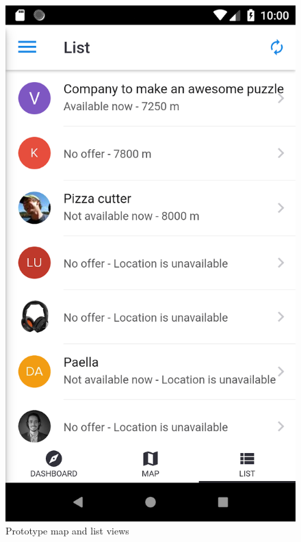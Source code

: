 \begin{figure}[ht]
  \includegraphics[scale=0.25]{images/screenshots/screenshot_list.png}
  \caption{Prototype map and list views}
  \label{fig:scr_list}
  \label{fig:scr_map}
\end{figure}

